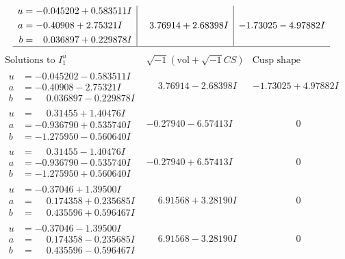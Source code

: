 \documentclass[1p]{elsarticle_modified}
\theoremstyle{definition}
\newcommand{\I}{\sqrt{-1}}
\begin{document}
$$\begin{array}{c|c|c}
\begin{aligned}
u &= -0.045202 + 0.583511 I \\
a &= -0.40908 + 2.75321 I \\
b &= \phantom{-}0.036897 + 0.229878 I\end{aligned}
 & \phantom{-}3.76914 + 2.68398 I & -1.73025 - 4.97882 I\\
 \hline 
 \end{array}$$\newpage$$\begin{array}{c|c|c}  
\text{Solutions to }I^u_{1}& \I (\text{vol} + \sqrt{-1}CS) & \text{Cusp shape}\\
 \hline 
\begin{aligned}
u &= -0.045202 - 0.583511 I \\
a &= -0.40908 - 2.75321 I \\
b &= \phantom{-}0.036897 - 0.229878 I\end{aligned}
 & \phantom{-}3.76914 - 2.68398 I & -1.73025 + 4.97882 I \\ \hline\begin{aligned}
u &= \phantom{-}0.31455 + 1.40476 I \\
a &= -0.936790 + 0.535740 I \\
b &= -1.275950 - 0.560640 I\end{aligned}
 & -0.27940 - 6.57413 I & \phantom{-0.000000 } 0 \\ \hline\begin{aligned}
u &= \phantom{-}0.31455 - 1.40476 I \\
a &= -0.936790 - 0.535740 I \\
b &= -1.275950 + 0.560640 I\end{aligned}
 & -0.27940 + 6.57413 I & \phantom{-0.000000 } 0 \\ \hline\begin{aligned}
u &= -0.37046 + 1.39500 I \\
a &= \phantom{-}0.174358 + 0.235685 I \\
b &= \phantom{-}0.435596 + 0.596467 I\end{aligned}
 & \phantom{-}6.91568 + 3.28190 I & \phantom{-0.000000 } 0 \\ \hline\begin{aligned}
u &= -0.37046 - 1.39500 I \\
a &= \phantom{-}0.174358 - 0.235685 I \\
b &= \phantom{-}0.435596 - 0.596467 I\end{aligned}
 & \phantom{-}6.91568 - 3.28190 I & \phantom{-0.000000 } 0 \\ \hline\begin{aligned}

\end{aligned}
\end{array}$$
\end{document}
